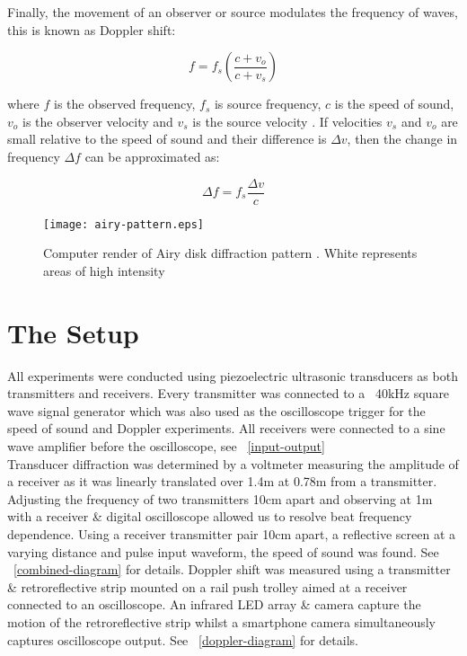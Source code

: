 \documentclass[a4paper,10pt,journal]{IEEEtran}
\newcommand{\figref}[2][\figurename~]{#1\ref{#2}}
\begin{document}
Finally, the movement of an observer or source modulates the frequency of waves, this is known as Doppler shift:

\begin{equation}
\label{eq:doppler}
	f = f_s(\frac{c+v_o}{c+v_s})
\end{equation}

where $f$ is the observed frequency, $f_s$ is source frequency, $c$ is the speed of sound, $v_o$ is the observer velocity and $v_s$ is the source velocity \cite{young-book}.
If velocities $v_s$ and $v_o$ are small relative to the speed of sound and their difference is $\Delta v$, then the change in frequency $\Delta f$ can be approximated as:

\begin{equation}
\label{eq:doppler-approx}
	\Delta f = f_s \frac{\Delta v}{c}
\end{equation}

\begin{figure}
	\centering
	\texttt{[image: airy-pattern.eps]}
	\caption{Computer render of Airy disk diffraction pattern \cite{airy-pattern}. White represents areas of high intensity}
	\label{airy-pattern}
\end{figure}

\section{The Setup}
All experiments were conducted using piezoelectric ultrasonic transducers as both transmitters and receivers. Every transmitter was connected to a ~40kHz square wave signal generator which was also used as the oscilloscope trigger for the speed of sound and Doppler experiments. All receivers were connected to a sine wave amplifier before the oscilloscope, see \figref{input-output}\\
Transducer diffraction was determined by a voltmeter measuring the amplitude of a receiver as it was linearly translated over 1.4m at 0.78m from a transmitter. Adjusting the frequency of two transmitters 10cm apart and observing at 1m with a receiver \& digital oscilloscope allowed us to resolve beat frequency dependence. Using a receiver transmitter pair 10cm apart, a reflective screen at a varying distance and pulse input waveform, the speed of sound was found. See \figref{combined-diagram} for details.
Doppler shift was measured using a transmitter \& retroreflective strip mounted on a rail push trolley aimed at a receiver connected to an oscilloscope. An infrared LED array \& camera capture the motion of the retroreflective strip whilst a smartphone camera simultaneously captures oscilloscope output. See \figref{doppler-diagram} for details.
\end{document}
